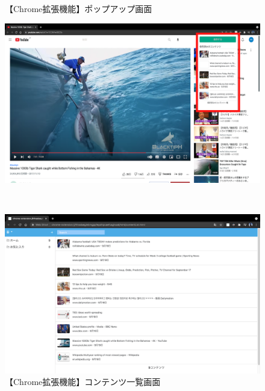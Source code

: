 \begin{figure}[htbp]
  \begin{minipage}[t]{\hsize}
    \caption{【Chrome拡張機能】ポップアップ画面}
    \label{fig:usage-chrome-popup}
    \begin{center}
      \includegraphics[bb=0 0 1280 800,width=15cm]{img/030_web_snapshot_system/chrome/usage-chrome-popup.pdf}
    \end{center}
  \end{minipage} \\

  \begin{minipage}[t]{\hsize}
    \caption{【Chrome拡張機能】コンテンツ一覧画面}
    \label{fig:usage-chrome-list}
    \begin{center}
      \includegraphics[bb=0 0 640 400,width=15cm]{img/030_web_snapshot_system/chrome/usage-chrome-list.pdf}
    \end{center}
  \end{minipage}
\end{figure}